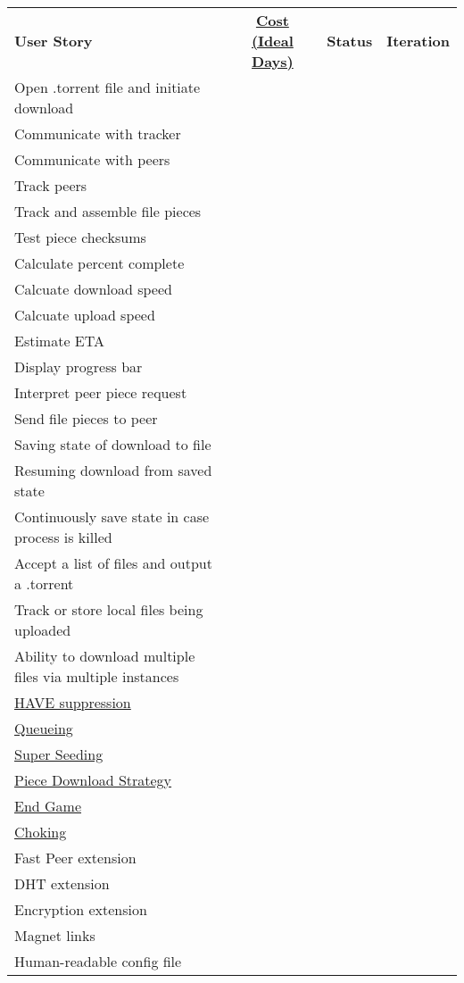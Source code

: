 \documentclass[letter]{scrartcl}
\begin{document}
\begin{tabularx}{\textwidth}{X c c c}
\textbf{User Story} & \href{http://c2.com/cgi/wiki?IdealProgrammingTime}{\textbf{Cost (Ideal Days)}}
& \textbf{Status} & \textbf{Iteration} \\
Open .torrent file and initiate download \\
Communicate with tracker \\
Communicate with peers \\
Track peers \\
Track and assemble file pieces \\
Test piece checksums \\
Calculate percent complete \\
Calcuate download speed \\
Calcuate upload speed \\
Estimate ETA \\
Display progress bar \\
Interpret peer piece request \\
Send file pieces to peer \\
Saving state of download to file \\
Resuming download from saved state \\
Continuously save state in case process is killed \\
Accept a list of files and output a .torrent \\
Track or store local files being uploaded \\
Ability to download multiple files via multiple instances \\
\href{https://wiki.theory.org/BitTorrentSpecification\#have:_.3Clen.3D0005.3E.3Cid.3D4.3E.3Cpiece_index.3E}{HAVE suppression} \\
\href{https://wiki.theory.org/BitTorrentSpecification\#Queuing}{Queueing} \\
\href{https://wiki.theory.org/BitTorrentSpecification\#Super_Seeding}{Super Seeding} \\
\href{https://wiki.theory.org/BitTorrentSpecification\#Piece_downloading_strategy}{Piece Download Strategy} \\
\href{https://wiki.theory.org/BitTorrentSpecification\#End_Game}{End Game} \\
\href{https://wiki.theory.org/BitTorrentSpecification\#Choking_and_Optimistic_Unchoking}{Choking} \\
Fast Peer extension \\
DHT extension \\
Encryption extension \\
Magnet links \\
Human-readable config file
\end{tabularx}
\end{document}
